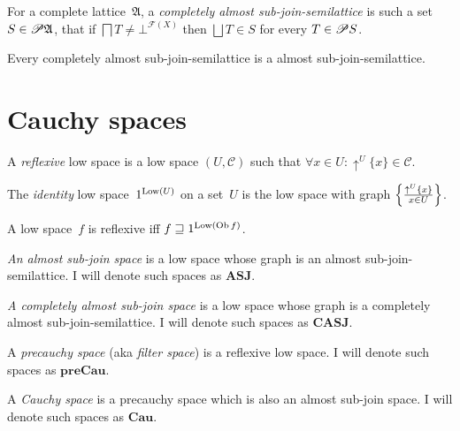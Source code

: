 \begin{defn}
For a complete lattice~$\mathfrak{A}$, a \emph{completely almost sub-join-semilattice} is such a set~$S\in\mathscr{P}\mathfrak{A}$, that
if $\bigsqcap T \neq \bot^{\mathscr{F}(X)}$ then $\bigsqcup T\in S$ for every $T\in\mathscr{P} S$.
\end{defn}

\begin{obvious}
Every completely almost sub-join-semilattice is a almost sub-join-semilattice.
\end{obvious}

\section{Cauchy spaces}

\begin{defn}
A \emph{reflexive} low space is a low space $( U , \mathscr{C})$ such that
$\forall x \in U : \uparrow^U \{ x \} \in \mathscr{C}$.
\end{defn}

\begin{defn}
The \emph{identity} low space~$1^{\operatorname{Low}(U)}$ on a set~$U$ is the low space with graph $\left\{ \frac{\uparrow^U \{x\}}{x\in U}\right\}$.
\end{defn}

\begin{obvious}\label{cs-refl-by-id}
A low space~$f$ is reflexive iff $f\sqsupseteq 1^{\operatorname{Low}(\operatorname{Ob} f)}$.
\end{obvious}

\begin{defn}
\emph{An almost sub-join space} is a low space whose graph is an almost sub-join-semilattice.
I will denote such spaces as $\mathbf{ASJ}$.
\end{defn}

\begin{defn}
\emph{A completely almost sub-join space} is a low space whose graph is a completely almost sub-join-semilattice.
I will denote such spaces as $\mathbf{CASJ}$.
\end{defn}

\begin{defn}
A \emph{precauchy space} (aka \emph{filter space}) is a reflexive low space.
I will denote such spaces as $\mathbf{preCau}$.
\end{defn}

\begin{defn}
A \emph{Cauchy space} is a precauchy space which is also an almost sub-join space.
I will denote such spaces as $\mathbf{Cau}$.
\end{defn}

